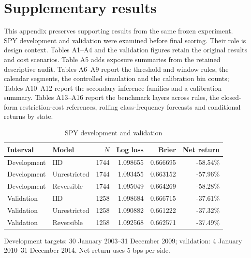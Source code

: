 \appendix
\section{Supplementary results}
This appendix preserves supporting results from the same frozen experiment.
SPY development and validation were examined before final scoring. Their role is
design context. Tables A1--A4 and the validation figures retain the original results and cost scenarios. Table A5 adds exposure summaries from the retained descriptive audit. Tables A6--A9 report the threshold and window rules, the calendar segments, the controlled simulation and the calibration bin counts; Tables A10--A12 report the secondary inference families and a calibration summary. Tables A13--A16 report the benchmark layers across rules, the closed-form restriction-cost references, rolling class-frequency forecasts and conditional returns by state.
\setcounter{table}{0}
\renewcommand{\thetable}{A\arabic{table}}
\renewcommand{\theHtable}{appendix.\arabic{table}}
\begin{table}[!htbp]\centering\small\setlength{\tabcolsep}{10pt}
\caption{SPY development and validation}\label{tab:validation}
\begin{tabular}{llrrrr}\toprule
Interval & Model & $N$ & Log loss & Brier & Net return\\\midrule
Development & IID & 1744 & 1.098655 & 0.666695 & -58.54\%\\
Development & Unrestricted & 1744 & 1.093455 & 0.663152 & -57.96\%\\
Development & Reversible & 1744 & 1.095049 & 0.664269 & -58.28\%\\
Validation & IID & 1258 & 1.098684 & 0.666715 & -37.61\%\\
Validation & Unrestricted & 1258 & 1.090882 & 0.661222 & -37.32\%\\
Validation & Reversible & 1258 & 1.092568 & 0.662571 & -37.49\%\\
\bottomrule\end{tabular}
\par\smallskip\parbox{0.98\linewidth}{\footnotesize Development targets: 30 January 2003--31 December 2009; validation: 4 January 2010--31 December 2014. Net return uses 5 bps per side.}
\end{table}

\clearpage
